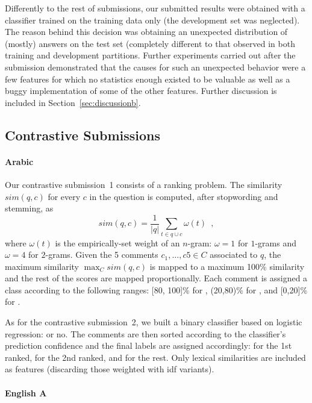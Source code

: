 Differently to the rest of 
submissions, our submitted results were obtained with a classifier trained on 
the training data only (the development set was neglected). The reason behind 
this decision was obtaining an unexpected distribution of (mostly) \yes answers 
on the test set (completely different to that observed in both training 
and development partitions. Further experiments carried out after the 
submission demonstrated that the causes for such an unexpected behavior were a 
few features for which no statistics enough existed to be valuable as well as a
buggy implementation of some of the other features. Further discussion is 
included in Section~\ref{sec:discussionb}.


\subsection{Contrastive Submissions}
\label{sub:contrastive}

\paragraph{Arabic} 

Our contrastive submission~1 consists of a ranking problem. The similarity 
$sim(q,c)$ for every $c$ in the question is computed, after stopwording and 
stemming, as 
\begin{equation}
 sim(q,c) = \frac{1}{|q|} \sum_{t\in q\cup c} \omega(t) \enspace ,
 \label{eq:overlap}
\end{equation}
% 
where $\omega(t)$ is the empirically-set weight of an $n$-gram: $\omega = 1$ 
for $1$-grams and $\omega = 4$ for $2$-grams. Given the 5 comments 
$c_1,\ldots,c5\in C$ associated to $q$, the maximum similarity $\max_C sim(q,c)$ 
is mapped to a maximum 100\% similarity and the rest of the scores are mapped 
proportionally. Each comment is assigned a class according to the following 
ranges: [80, 100]\% for \dir, (20,80)\% for \rel, and [0,20]\% for \irel.


As for the contrastive submission~2, we built a binary classifier based on 
logistic regression: \dir or no. The comments are then sorted according to the 
classifier's prediction confidence and the final labels are assigned 
accordingly: \dir for the 1st ranked, \rel for the 2nd ranked, and \irel for the 
rest. Only lexical similarities are included as features (discarding those 
weighted with idf variants).

\paragraph{English A}

